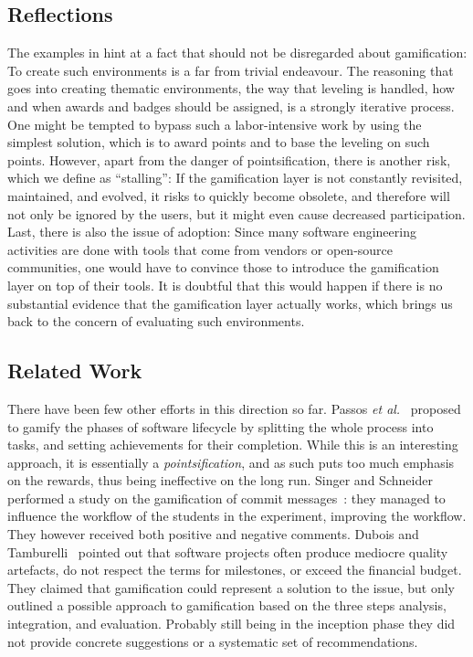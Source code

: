 \subsection{Reflections}

The examples in  hint at a fact that should not be disregarded about gamification: To create such environments is a far from trivial endeavour.
The reasoning that goes into creating thematic environments, the way that leveling is handled, how and when awards and badges should be assigned, is a strongly iterative process.
One might be tempted to bypass such a labor-intensive work by using the simplest solution, which is to award points and to base the leveling on such points.
However, apart from the danger of pointsification, there is another risk, which we define as ``stalling'': If the gamification layer is not constantly revisited, maintained, and evolved, it risks to quickly become obsolete, and therefore will not only be ignored by the users, but it might even cause decreased participation.
Last, there is also the issue of adoption: Since many software engineering activities are done with tools that come from vendors or open-source communities, one would have to convince those to introduce the gamification layer on top of their tools.
It is doubtful that this would happen if there is no substantial evidence that the gamification layer actually works, which brings us back to the concern of evaluating such environments.

\subsection{Related Work}

There have been few other efforts in this direction so far.
Passos \textit{et al.}~\cite{PassosMNC11} proposed to gamify the phases of software lifecycle by splitting the whole process into tasks, and setting achievements for their completion.
While this is an interesting approach, it is essentially a \emph{pointsification}, and as such puts too much emphasis on the rewards, thus being ineffective on the long run.
Singer and Schneider performed a study on the gamification of commit messages~\cite{sing2012}: they managed to influence the workflow of the students in the experiment, improving the workflow.
They however received both positive and negative comments.
Dubois and Tamburelli~\cite{Dubois2013a} pointed out that software projects often produce mediocre quality artefacts, do not respect the terms for milestones, or exceed the financial budget.
They claimed that gamification could represent a solution to the issue, but only outlined a possible approach to gamification based on the three steps analysis, integration, and evaluation.
Probably still being in the inception phase they did not provide concrete suggestions or a systematic set of recommendations.

